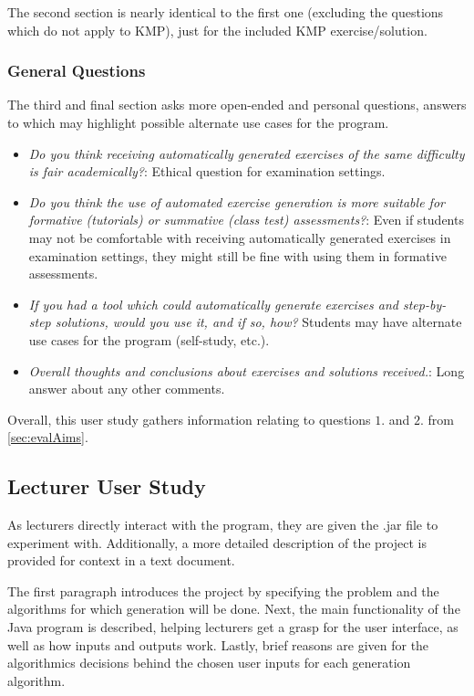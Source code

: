 \documentclass{l4proj}
\begin{document}
The second section is nearly identical to the first one (excluding the questions which do not apply to KMP), just for the included KMP exercise/solution.

\subsubsection{General Questions}

The third and final section asks more open-ended and personal questions, answers to which may highlight possible alternate use cases for the program.

\begin{itemize}
	\item
	\emph{Do you think receiving automatically generated exercises of the same difficulty is fair academically?}: Ethical question for examination settings.
	\item
	\emph{Do you think the use of automated exercise generation is more suitable for formative (tutorials) or summative (class test) assessments?}: Even if students may not be comfortable with receiving automatically generated exercises in examination settings, they might still be fine with using them in formative assessments.
	\item
	\emph{If you had a tool which could automatically generate exercises and step-by-step solutions, would you use it, and if so, how?} Students may have alternate use cases for the program (self-study, etc.).
	\item
	\emph{Overall thoughts and conclusions about exercises and solutions received.}: Long answer about any other comments.
\end{itemize}

Overall, this user study gathers information relating to questions $1.$ and $2.$ from \autoref{sec:evalAims}.

\subsection{Lecturer User Study}

As lecturers directly interact with the program, they are given the .jar file to experiment with. Additionally, a more detailed description of the project is provided for context in a text document.

The first paragraph introduces the project by specifying the problem and the algorithms for which generation will be done. Next, the main functionality of the Java program is described, helping lecturers get a grasp for the user interface, as well as how inputs and outputs work. Lastly, brief reasons are given for the algorithmics decisions behind the chosen user inputs for each generation algorithm.
\end{document}
